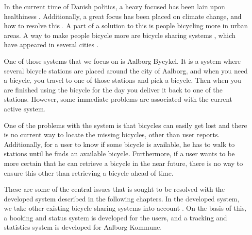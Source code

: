 	
	

In the current time of Danish politics, a heavy focused has been lain upon healthiness \citep{misc:nationalemaalhelbred}.
Additionally, a great focus has been placed on climate change, and how to resolve this \citep{misc:klima}.
A part of a solution to this is people bicycling more in urban areas.
A way to make people bicycle more are bicycle sharing systems \citep{misc:impactofbikeshare}, which have appeared in several cities \citep{misc:cibi, misc:bycyklen, misc:AltaBicycleShare, misc:aalborgbycykelMain}.

One of those systems that we focus on is Aalborg Bycykel.
It is a system where several bicycle stations are placed around the city of Aalborg, and when you need a bicycle, you travel to one of those stations and pick a bicycle.
Then when you are finished using the bicycle for the day you deliver it back to one of the stations.
However, some immediate problems are associated with the current active system.

One of the problems with the system is that bicycles can easily get lost and there is no current way to locate the missing bicycles, other than user reports.
Additionally, for a user to know if some bicycle is available, he has to walk to stations until he finds an available bicycle.
Furthermore, if a user wants to be more certain that he can retrieve a bicycle in the near future, there is no way to ensure this other than retrieving a bicycle ahead of time.

These are some of the central issues that is sought to be resolved with the developed system described in the following chapters.
In the developed system, we take other existing bicycle sharing systems into account \citep{misc:cibi, misc:bycyklen, misc:AltaBicycleShare}.
On the basis of this, a booking and status system is developed for the users, and a tracking and statistics system is developed for Aalborg Kommune.